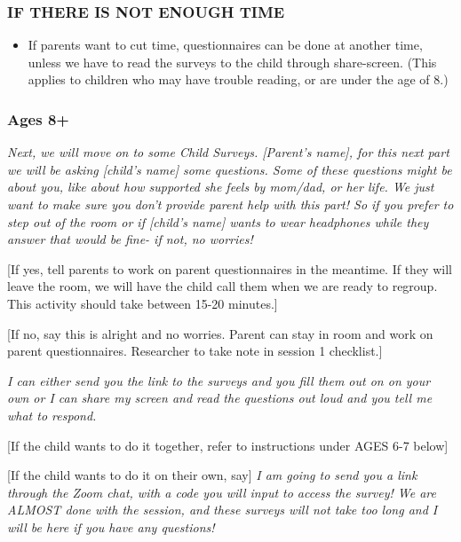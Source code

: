 \documentclass[]{book}
\providecommand{\tightlist}{%
  \setlength{\itemsep}{0pt}\setlength{\parskip}{0pt}}
\begin{document}
\hypertarget{if-there-is-not-enough-time-1}{%
\subsubsection{IF THERE IS NOT ENOUGH TIME}\label{if-there-is-not-enough-time-1}}

\begin{itemize}
\tightlist
\item
  If parents want to cut time, questionnaires can be done at another time, unless we have to read the surveys to the child through share-screen. (This applies to children who may have trouble reading, or are under the age of 8.)
\end{itemize}

\hypertarget{ages-8-1}{%
\subsubsection{Ages 8+}\label{ages-8-1}}

\emph{Next, we will move on to some Child Surveys. {[}Parent's name{]}, for this next part we will be asking {[}child's name{]} some questions. Some of these questions might be about you, like about how supported she feels by mom/dad, or her life. We just want to make sure you don't provide parent help with this part! So if you prefer to step out of the room or if {[}child's name{]} wants to wear headphones while they answer that would be fine- if not, no worries!}

{[}If yes, tell parents to work on parent questionnaires in the meantime. If they will leave the room, we will have the child call them when we are ready to regroup. This activity should take between 15-20 minutes.{]}

{[}If no, say this is alright and no worries. Parent can stay in room and work on parent questionnaires. Researcher to take note in session 1 checklist.{]}

\emph{I can either send you the link to the surveys and you fill them out on on your own or I can share my screen and read the questions out loud and you tell me what to respond.}

{[}If the child wants to do it together, refer to instructions under AGES 6-7 below{]}

{[}If the child wants to do it on their own, say{]} \emph{I am going to send you a link through the Zoom chat, with a code you will input to access the survey! We are ALMOST done with the session, and these surveys will not take too long and I will be here if you have any questions! }
\end{document}
